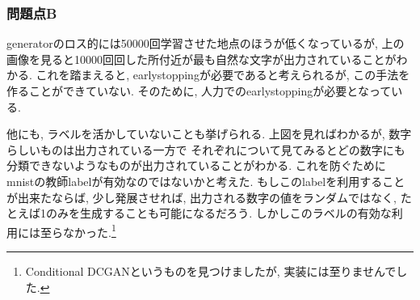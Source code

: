 \documentclass[a4paper,11pt]{jsarticle}
\begin{document}
\subsubsection*{問題点B}
generatorのロス的には50000回学習させた地点のほうが低くなっているが,
上の画像を見ると10000回回した所付近が最も自然な文字が出力されていることがわかる.
これを踏まえると, earlystoppingが必要であると考えられるが, この手法を作ることができていない.
そのために, 人力でのearlystoppingが必要となっている.

他にも, ラベルを活かしていないことも挙げられる. 上図を見ればわかるが, 数字らしいものは出力されている一方で
それぞれについて見てみるとどの数字にも分類できないようなものが出力されていることがわかる.
これを防ぐためにmnistの教師labelが有効なのではないかと考えた. もしこのlabelを利用することが出来たならば,
少し発展させれば, 出力される数字の値をランダムではなく, たとえば1のみを生成することも可能になるだろう.
しかしこのラベルの有効な利用には至らなかった.\footnote{Conditional DCGANというものを見つけましたが, 実装には至りませんでした.}
\end{document}
